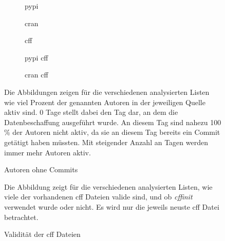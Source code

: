 \begin{figure}
    \begin{subfigure}{.5\textwidth}
        \centering
        
        \caption{\gls{pypi}}
        \label{fig:total_authors_no_commits_pypi}
    \end{subfigure}%
    \begin{subfigure}{.5\textwidth}
        \centering
        
        \caption{\gls{cran}}
        \label{fig:total_authors_no_commits_cran}
    \end{subfigure}
    \begin{subfigure}{.5\textwidth}
        \centering
        
        \caption{\gls{cff}}
        \label{fig:total_authors_no_commits_cff}
    \end{subfigure}%
    \begin{subfigure}{.5\textwidth}
        \centering
        
        \caption{\gls{pypi} \gls{cff}}
        \label{fig:total_authors_no_commits_pypi_cff}
    \end{subfigure}
    \centering
    \begin{subfigure}{.5\textwidth}
        \centering
        
        \caption{\gls{cran} \gls{cff}}
        \label{fig:total_authors_no_commits_cran_cff}
    \end{subfigure}
    \caption{Autoren ohne Commits}
    \small
    Die Abbildungen zeigen für die verschiedenen analysierten Listen wie viel Prozent der genannten Autoren in der jeweiligen Quelle aktiv sind. 0 Tage stellt dabei den Tag dar, an dem die Datenbeschaffung ausgeführt wurde. An diesem Tag sind nahezu 100 \% der Autoren nicht aktiv, da sie an diesem Tag bereits ein Commit getätigt haben müssten. Mit steigender Anzahl an Tagen werden immer mehr Autoren aktiv.
\end{figure}

\begin{figure}
    
    \label{fig:overall_valid_cff}
    \caption{Validität der \gls{cff} Dateien}
    \small
    Die Abbildung zeigt für die verschiedenen analysierten Listen, wie viele der vorhandenen \gls{cff} Dateien valide sind, und ob \emph{cffinit} verwendet wurde oder nicht. Es wird nur die jeweils neuste \gls{cff} Datei betrachtet.
\end{figure}

